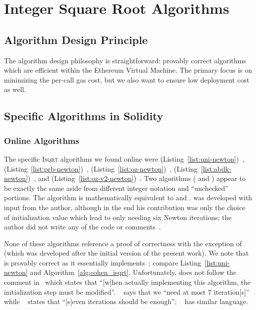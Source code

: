\section{Integer Square Root Algorithms}

\subsection{Algorithm Design Principle}

The algorithm design philosophy is straightforward:
provably correct algorithms which are efficient within the
Ethereum Virtual Machine.
The primary focus is on minimizing the per-call gas cost,
but we also want to ensure low deployment cost as well.

\subsection{Specific Algorithms in Solidity}

\subsubsection{Online Algorithms}

The specific \textsc{Isqrt} algorithms we found online were
\Uniswap{} (Listing~\ref{list:uni-newton})~\cite{uniswap-v2},
\prb{} (Listing~\ref{list:prb-newton})~\cite{prb-math},
\OpenZeppelin{} (Listing~\ref{list:oz-newton})~\cite{open-zeppelin},
\abdk{} (Listing~\ref{list:abdk-newton})~\cite{abdk-consulting}, and
\OpenZeppelinTwo{} (Listing~\ref{list:oz-v2-newton})~\cite{open-zeppelin-v2}.
Two algorithms (\prb{} and \abdk{})
appear to be exactly the same aside from different integer notation
and ``unchecked'' portions.
The \OpenZeppelin{} algorithm is mathematically equivalent
to \prb{} and \abdk{}.
\OpenZeppelinTwo{} was developed with input from the author,
although in the end his contribution was only the choice
of initialization value which lead to only needing six Newton iterations;
the author did not write any of the code
or comments~\cite{OpenZeppelinIsqrtCommit}.

None of these algorithms reference a proof of correctness
with the exception of \OpenZeppelinTwo{}
(which was developed after the initial version of the present work).
We note that \Uniswap{}
is provably correct as it essentially
implements~\cite[Algorithm 1.7.1]{cohen1993};
compare Listing~\ref{list:uni-newton} and Algorithm~\ref{alg:cohen_isqrt}.
Unfortunately, \Uniswap{} does not follow the comment
in~\cite[Chapter 1.7, Remarks]{cohen1993} which states that
``[w]hen actually implementing this algorithm,
the initialization step must be modified''.
\OpenZeppelin{}~\cite{open-zeppelin}
says that we ``need at most 7 iteration[s]''
while  \abdk{}~\cite{abdk-consulting} states that
``[s]even iterations should be enough'';
\prb{}~\cite{prb-math} has similar language.

